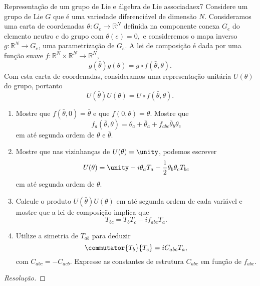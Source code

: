 \begin{exercício}{Representação de um grupo de Lie e álgebra de Lie associada}{ex7}
   Considere um grupo de Lie \(G\) que é uma variedade diferenciável de dimensão \(N\). Consideramos uma carta de coordenadas \(\theta : G_e \to \mathbb{R}^N\) definida na componente conexa \(G_e\) do elemento neutro \(e\) do grupo com \(\theta(e) = 0,\) e consideremos o mapa inverso \(g : \mathbb{R}^N \to G_e\), uma parametrização de \(G_e\). A lei de composição é dada por uma função suave \(f : \mathbb{R}^N \times \mathbb{R}^N \to \mathbb{R}^N\),
   \begin{equation*}
       g(\bar{\theta}) g(\theta) = g \circ f(\bar{\theta}, \theta).
   \end{equation*}
   Com esta carta de coordenadas, consideramos uma representação unitária \(U(\theta)\) do grupo, portanto
   \begin{equation*}
       U(\bar{\theta})U(\theta) = U \circ f(\bar{\theta}, \theta).
   \end{equation*}
   \begin{enumerate}[label=(\alph*)]
       \item Mostre que \(f(\bar{\theta}, 0) = \bar{\theta}\) e que \(f(0, \theta) = \theta\). Mostre que
          \begin{equation*}
             f_a(\bar{\theta}, \theta) = \theta_a + \bar{\theta}_a + f_{abc} \bar{\theta}_b \theta_c
          \end{equation*}
          em até segunda ordem de \(\theta\) e \(\bar{\theta}\).
       \item Mostre que nas vizinhanças de \(U(\theta) = \unity\), podemos escrever
          \begin{equation*}
             U(\theta) = \unity - i \theta_a T_a - \frac12 \theta_b \theta_c T_{bc}
          \end{equation*}
          em até segunda ordem de \(\theta\).
       \item Calcule o produto \(U(\bar{\theta})U(\theta)\) em até segunda ordem de cada variável e mostre que a lei de composição implica que
          \begin{equation*}
          T_{bc} = T_{b} T_{c} - i f_{abc} T_a.
          \end{equation*}
       \item Utilize a simetria de \(T_{ab}\) para deduzir
          \begin{equation*}
          \commutator{T_b}{T_c} = i C_{abc} T_a,
          \end{equation*}
          com \(C_{abc} = -C_{acb}.\) Expresse as constantes de estrutura \(C_{abc}\) em função de \(f_{abc}.\)
   \end{enumerate}
\end{exercício}
\begin{proof}[Resolução]
    
\end{proof}

